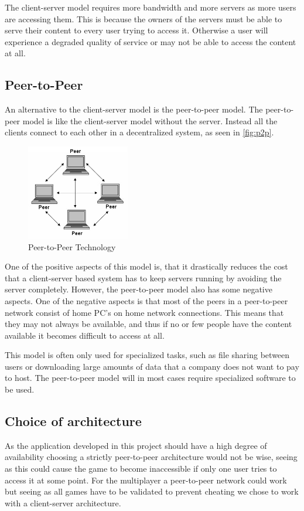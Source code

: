 The client-server model requires more bandwidth and more servers as more users are accessing them. This is because the owners of the servers must be able to serve their content to every user trying to access it. Otherwise a user will experience a degraded quality of service or may not be able to access the content at all.

\subsection{Peer-to-Peer}
An alternative to the client-server model is the peer-to-peer model.
The peer-to-peer model is like the client-server model without the server.
Instead all the clients connect to each other in a decentralized system, as seen in \autoref{fig:p2p}.

\begin{figure}[ht]
  \centering
    \includegraphics[width=0.4\textwidth]{img/p2p.jpg}
  \caption{Peer-to-Peer Technology \citep{PeerToPeer}}
  \label{fig:p2p}
\end{figure}

One of the positive aspects of this model is, that it drastically reduces the cost that a client-server based system has to keep servers running by avoiding the server completely.
However, the peer-to-peer model also has some negative aspects.
One of the negative aspects is that most of the peers in a peer-to-peer network consist of home PC's on home network connections. This means that they may not always be available, and thus if no or few people have the content available it becomes difficult to access at all.

This model is often only used for specialized tasks, such as file sharing between users or downloading large amounts of data that a company does not want to pay to host.
The peer-to-peer model will in most cases require specialized software to be used.

\subsection{Choice of architecture}

As the application developed in this project should have a high degree of availability choosing a strictly peer-to-peer architecture would not be wise, seeing as this could cause the game to become inaccessible if only one user tries to access it at some point. For the multiplayer a peer-to-peer network could work but seeing as all games have to be validated to prevent cheating we chose to work with a client-server architecture.
